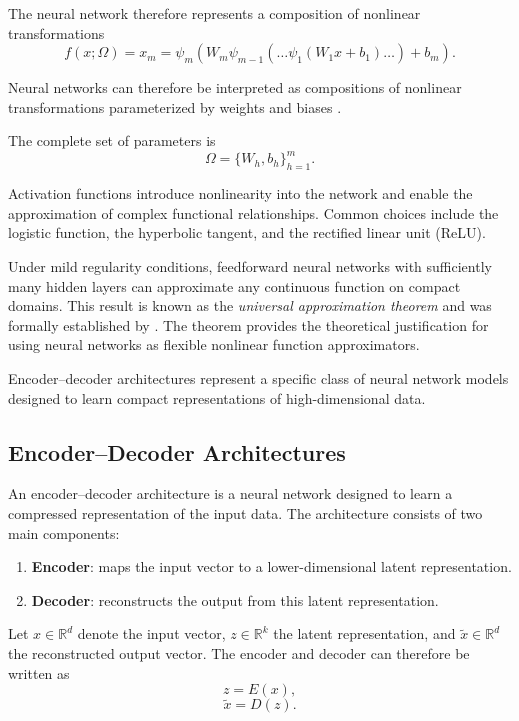 The neural network therefore represents a composition of nonlinear transformations
\[
f(x;\Omega) = x_m
= \psi_m\!\left(W_m \psi_{m-1}\!\left(\dots \psi_1(W_1 x + b_1)\dots \right) + b_m \right).
\]

Neural networks can therefore be interpreted as compositions of nonlinear transformations parameterized by weights and biases \citep{Bishop2006}.

The complete set of parameters is
\begin{equation}
\Omega = \{W_h, b_h\}_{h=1}^{m}.
\end{equation}

Activation functions introduce nonlinearity into the network and enable the approximation of complex functional relationships. Common choices include the logistic function, the hyperbolic tangent, and the rectified linear unit (ReLU).

Under mild regularity conditions, feedforward neural networks with sufficiently many hidden layers can approximate any continuous function on compact domains. This result is known as the \emph{universal approximation theorem} and was formally established by \citet{Hornik1989}. The theorem provides the theoretical justification for using neural networks as flexible nonlinear function approximators.

Encoder--decoder architectures represent a specific class of neural network models designed to learn compact representations of high-dimensional data.

\subsection{Encoder--Decoder Architectures}

An encoder--decoder architecture is a neural network designed to learn a compressed representation of the input data. The architecture consists of two main components:
\begin{enumerate}
\item \textbf{Encoder}: maps the input vector to a lower-dimensional latent representation.
\item \textbf{Decoder}: reconstructs the output from this latent representation.
\end{enumerate}

Let $x \in \mathbb{R}^{d}$ denote the input vector, $z \in \mathbb{R}^{k}$ the latent representation, and $\tilde{x} \in \mathbb{R}^{d}$ the reconstructed output vector. The encoder and decoder can therefore be written as
\begin{equation}
z = E(x),
\end{equation}
\begin{equation}
\tilde{x} = D(z).
\end{equation}

